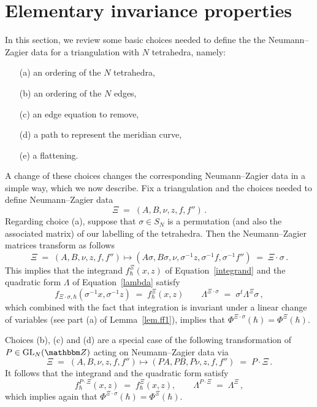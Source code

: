 \documentclass[12pt,reqno]{amsart}
\theoremstyle{definition}
\def\BZ{\mathbbm Z}
\def\be{\begin{equation}}
\def\ee{\end{equation}}
\def\GL{\mathrm{GL}}
\renewcommand{\=}{\;=\;}
\begin{document}

\section{Elementary invariance properties}
\label{sec.elementary}

In this section, we review some basic choices needed to define the
the Neumann--Zagier data for a triangulation with $N$ tetrahedra, namely:
\begin{itemize}
\item[(a)] an ordering of the $N$ tetrahedra,
\item[(b)] an ordering of the $N$ edges,
\item[(c)] an edge equation to remove,   
\item[(d)] a path to represent the meridian curve,
\item[(e)] a flattening.
\end{itemize}
A change of these choices changes the corresponding Neumann--Zagier data in a simple
way, which we now describe. Fix a triangulation and the choices needed to define
Neumann--Zagier data
\be
\Xi\=(A,B,\nu,z,f,f'')\,.
\ee
Regarding choice (a), suppose that $\sigma\in S_{N}$ is a permutation (and also the
associated matrix) of our labelling of the tetrahedra. Then the Neumann--Zagier
matrices transform as follows
\be
  \Xi\=(A,B,\nu,z,f,f'')
  \mapsto
  (A\sigma,B\sigma,\nu,\sigma^{-1} z,\sigma^{-1} f,\sigma^{-1} f'')
  \=\Xi\cdot\sigma \,.
\ee
This implies that the integrand $f^\Xi_\hbar(x,z)$ of Equation~\eqref{integrand}
and the quadratic form $\Lambda$ of Equation~\eqref{lambda} satisfy
\be
f_{\Xi\cdot\sigma,\hbar}(\sigma^{-1} x,\sigma^{-1} z) \= f^\Xi_\hbar(x,z)
\qquad
\Lambda^{\Xi\cdot\sigma} \= \sigma^t \Lambda^\Xi \sigma\,,
\ee
which combined with the fact that integration is invariant under a linear change
of variables (see part (a) of Lemma~\ref{lem.ff1}), implies that
$\Phi^{\Xi\cdot\sigma}(\hbar)=\Phi^\Xi(\hbar)$.  

Choices (b), (c) and (d) are a special case of the following transformation of
$P\in\GL_{N}(\BZ)$ acting on Neumann--Zagier data via
\be
\Xi\=(A,B,\nu,z,f,f'') \mapsto (PA,PB,P\nu,z,f,f'') \=P\cdot\Xi\,.
\ee
It follows that the integrand and the quadratic form satisfy 
\be
f^{P\cdot\Xi}_\hbar(x,z) \= f^\Xi_\hbar(x,z), \qquad
\Lambda^{P \cdot\Xi} \= \Lambda^\Xi \,,
\ee
which implies again that $\Phi^{\Xi\cdot\sigma}(\hbar)=\Phi^\Xi(\hbar)$.
\end{document}
